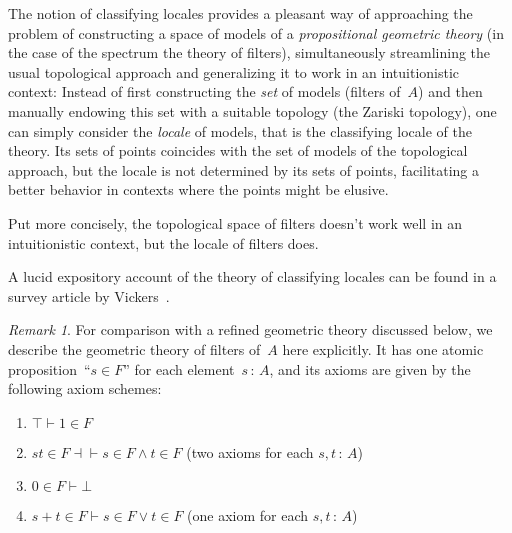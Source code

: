 \documentclass[10pt,reqno,a4paper]{amsbook}
\theoremstyle{definition}
\theoremstyle{plain}
\theoremstyle{remark}
\newtheorem{rem}[defn]{Remark}
\newcommand{\?}{\,{:}\,}
\renewcommand{\_}{\mathpunct{.}\,}
\begin{document}
{The notion of classifying locales provides a pleasant way of approaching the
problem of constructing a space of models of a \emph{propositional geometric
theory} (in the case of the spectrum the theory of filters), simultaneously
streamlining the usual topological approach and generalizing it to work in an
intuitionistic context: Instead of first constructing the \emph{set} of models
(filters of~$A$) and then manually endowing this set with a suitable topology
(the Zariski topology), one can simply consider the \emph{locale} of models,
that is the classifying locale of the theory. Its sets of points coincides with
the set of models of the topological approach, but the locale is not determined
by its sets of points, facilitating a better behavior in contexts where the
points might be elusive.

Put more concisely, the topological space of filters doesn't work well in an
intuitionistic context, but the locale of filters does.

A lucid expository account of the theory of classifying locales can be found in
a survey article by Vickers~\cite{vickers:locales-toposes}.

\begin{rem}\label{rem:theory-of-filters}
For comparison with a refined geometric theory discussed below, we describe the
geometric theory of filters of~$A$ here explicitly. It has one atomic
proposition~``$s \in F$'' for each element~$s \? A$, and its axioms are given by the
following axiom schemes:
\begin{enumerate}
\item $\top \vdash 1 \in F$
\item $st \in F \dashv\vdash s \in F \wedge t \in F$ (two axioms for each $s,t\?A$)
\item $0 \in F \vdash \bot$
\item $s+t \in F \vdash s \in F \vee t \in F$ (one axiom for each $s,t\?A$)
\end{enumerate}
\end{rem}


}
\end{document}
